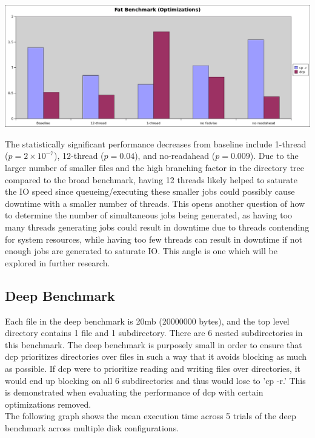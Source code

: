 \documentclass[12pt]{article}
\begin{document}
\includegraphics[width=500pt]{report/graphs/fat-optimizations.png}

\vspace{5mm}

The statistically significant performance decreases from baseline
include 1-thread ($p = 2 \times 10^{-7}$), 12-thread ($p = 0.04$), and no-readahead ($p = 0.009$).
Due to the larger number of smaller files and the high branching factor in the directory tree compared
to the broad benchmark, having 12 threads likely helped to saturate the IO speed since queueing/executing
these smaller jobs could possibly cause downtime with a smaller number of threads. This opens another question
of how to determine the number of simultaneous jobs being generated, as having too many threads generating jobs
could result in downtime due to threads contending for system resources, while having too few threads can
result in downtime if not enough jobs are generated to saturate IO. This angle is one which will be
explored in further research. \\

\subsection{Deep Benchmark}
Each file in the deep benchmark is 20mb (20000000 bytes), and
the top level directory contains 1 file and 1 subdirectory. There
are 6 nested subdirectories in this benchmark.
The deep benchmark is purposely small in order to ensure that dcp prioritizes
directories over files in such a way that it avoids blocking as much as possible.
If dcp were to prioritize reading and writing files over directories, it would end up
blocking on all 6 subdirectories and thus would lose to 'cp -r.' This is demonstrated
when evaluating the performance of dcp with certain optimizations removed. \\

\noindent
The following graph shows the mean execution time across 5 trials of the deep benchmark across multiple disk configurations. \\
\end{document}
